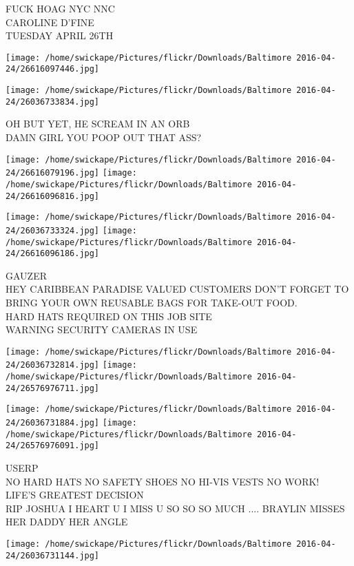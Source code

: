 \documentclass[10pt,letterpaper]{article}
\begin{document}
FUCK HOAG NYC NNC\\
CAROLINE D'FINE\\
TUESDAY APRIL 26TH
\pagebreak

\texttt{[image: /home/swickape/Pictures/flickr/Downloads/Baltimore 2016-04-24/26616097446.jpg]}

\vspace{0.25in}
\texttt{[image: /home/swickape/Pictures/flickr/Downloads/Baltimore 2016-04-24/26036733834.jpg]}

OH BUT YET, HE SCREAM IN AN ORB\\
DAMN GIRL YOU POOP OUT THAT ASS?
\pagebreak

\texttt{[image: /home/swickape/Pictures/flickr/Downloads/Baltimore 2016-04-24/26616079196.jpg]}
\texttt{[image: /home/swickape/Pictures/flickr/Downloads/Baltimore 2016-04-24/26616096816.jpg]}

\texttt{[image: /home/swickape/Pictures/flickr/Downloads/Baltimore 2016-04-24/26036733324.jpg]}
\texttt{[image: /home/swickape/Pictures/flickr/Downloads/Baltimore 2016-04-24/26616096186.jpg]}

GAUZER\\
HEY CARIBBEAN PARADISE VALUED CUSTOMERS DON'T FORGET TO BRING YOUR OWN REUSABLE BAGS FOR TAKE{-}OUT FOOD.\\
HARD HATS REQUIRED ON THIS JOB SITE\\
WARNING SECURITY CAMERAS IN USE
\pagebreak

\texttt{[image: /home/swickape/Pictures/flickr/Downloads/Baltimore 2016-04-24/26036732814.jpg]}
\texttt{[image: /home/swickape/Pictures/flickr/Downloads/Baltimore 2016-04-24/26576976711.jpg]}

\texttt{[image: /home/swickape/Pictures/flickr/Downloads/Baltimore 2016-04-24/26036731884.jpg]}
\texttt{[image: /home/swickape/Pictures/flickr/Downloads/Baltimore 2016-04-24/26576976091.jpg]}

USERP\\
NO HARD HATS NO SAFETY SHOES NO HI{-}VIS VESTS NO WORK!\\
LIFE'S GREATEST DECISION\\
RIP JOSHUA I HEART U I MISS U SO SO SO MUCH .... BRAYLIN MISSES HER DADDY HER ANGLE
\pagebreak

\texttt{[image: /home/swickape/Pictures/flickr/Downloads/Baltimore 2016-04-24/26036731144.jpg]}
\end{document}
